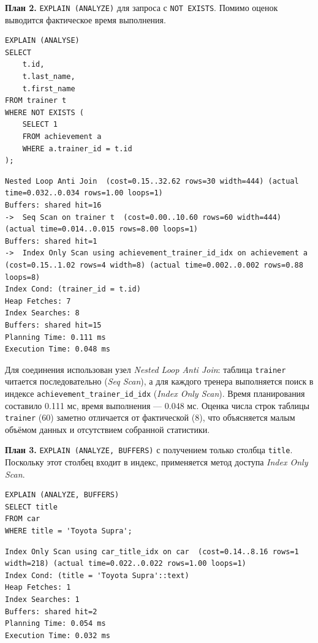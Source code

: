 \documentclass[oneside,a4paper,14pt]{extarticle}
\begin{document}
\textbf{План 2.} \texttt{EXPLAIN (ANALYZE)} для запроса с \texttt{NOT EXISTS}. Помимо оценок выводится фактическое время выполнения.

\begin{verbatim}
EXPLAIN (ANALYSE)
SELECT
    t.id,
    t.last_name,
    t.first_name
FROM trainer t
WHERE NOT EXISTS (
    SELECT 1
    FROM achievement a
    WHERE a.trainer_id = t.id
);
\end{verbatim}

\begin{Verbatim}[fontsize=\scriptsize,breaklines=true,breakanywhere=true]
Nested Loop Anti Join  (cost=0.15..32.62 rows=30 width=444) (actual time=0.032..0.034 rows=1.00 loops=1)
Buffers: shared hit=16
->  Seq Scan on trainer t  (cost=0.00..10.60 rows=60 width=444) (actual time=0.014..0.015 rows=8.00 loops=1)
Buffers: shared hit=1
->  Index Only Scan using achievement_trainer_id_idx on achievement a  (cost=0.15..1.02 rows=4 width=8) (actual time=0.002..0.002 rows=0.88 loops=8)
Index Cond: (trainer_id = t.id)
Heap Fetches: 7
Index Searches: 8
Buffers: shared hit=15
Planning Time: 0.111 ms
Execution Time: 0.048 ms
\end{Verbatim}


Для соединения использован узел \textit{Nested Loop Anti Join}: таблица \texttt{trainer} читается последовательно (\textit{Seq Scan}), а для каждого тренера выполняется поиск в индексе \texttt{achievement\_trainer\_id\_idx} (\textit{Index Only Scan}). Время планирования составило 0.111 мс, время выполнения --- 0.048 мс. Оценка числа строк таблицы \texttt{trainer} (60) заметно отличается от фактической (8), что объясняется малым объёмом данных и отсутствием собранной статистики.


\textbf{План 3.} \texttt{EXPLAIN (ANALYZE, BUFFERS)} с получением только столбца \texttt{title}. Поскольку этот столбец входит в индекс, применяется метод доступа \textit{Index Only Scan}.

\begin{verbatim}
EXPLAIN (ANALYZE, BUFFERS)
SELECT title
FROM car
WHERE title = 'Toyota Supra';
\end{verbatim}

\begin{Verbatim}[fontsize=\scriptsize,breaklines=true,breakanywhere=true]
Index Only Scan using car_title_idx on car  (cost=0.14..8.16 rows=1 width=218) (actual time=0.022..0.022 rows=1.00 loops=1)
Index Cond: (title = 'Toyota Supra'::text)
Heap Fetches: 1
Index Searches: 1
Buffers: shared hit=2
Planning Time: 0.054 ms
Execution Time: 0.032 ms
\end{Verbatim}
\end{document}
